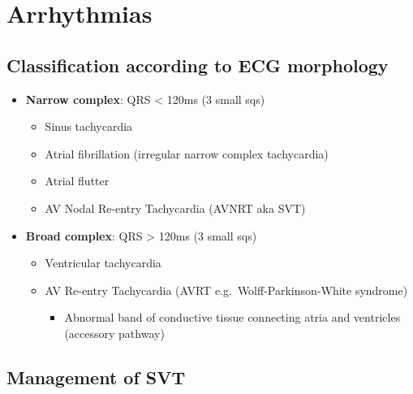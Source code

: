 \documentclass[
  12pt,
]{memoir}
\providecommand{\tightlist}{%
  \setlength{\itemsep}{0pt}\setlength{\parskip}{0pt}}
\begin{document}
\hypertarget{arrhythmias}{%
\section{Arrhythmias}\label{arrhythmias}}

\hypertarget{classification-according-to-ecg-morphology}{%
\subsection{Classification according to ECG
morphology}\label{classification-according-to-ecg-morphology}}

\begin{itemize}
\tightlist
\item
  \textbf{Narrow complex}: QRS \textless{} 120ms (3 small sqs)

  \begin{itemize}
  \tightlist
  \item
    Sinus tachycardia
  \item
    Atrial fibrillation (irregular narrow complex tachycardia)
  \item
    Atrial flutter
  \item
    AV Nodal Re-entry Tachycardia (AVNRT aka SVT)
  \end{itemize}
\item
  \textbf{Broad complex}: QRS \textgreater{} 120ms (3 small sqs)

  \begin{itemize}
  \tightlist
  \item
    Ventricular tachycardia
  \item
    AV Re-entry Tachycardia (AVRT e.g.~Wolff-Parkinson-White syndrome)

    \begin{itemize}
    \tightlist
    \item
      Abnormal band of conductive tissue connecting atria and ventricles
      (accessory pathway)
    \end{itemize}
  \end{itemize}
\end{itemize}

\hypertarget{management-of-svt}{%
\subsection{Management of SVT}\label{management-of-svt}}
\end{document}
